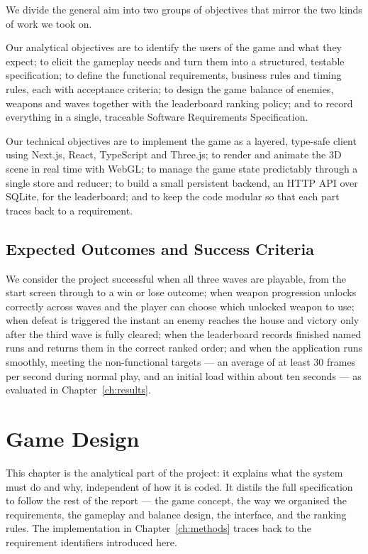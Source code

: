 \documentclass[12pt,a4paper]{report}
\begin{document}
We divide the general aim into two groups of objectives that mirror the two
kinds of work we took on.

Our analytical objectives are to identify the users of the game and what they
expect; to elicit the gameplay needs and turn them into a structured, testable
specification; to define the functional requirements, business rules and timing
rules, each with acceptance criteria; to design the game balance of enemies,
weapons and waves together with the leaderboard ranking policy; and to record
everything in a single, traceable Software Requirements Specification.

Our technical objectives are to implement the game as a layered, type-safe
client using Next.js, React, TypeScript and Three.js; to render and animate the
3D scene in real time with WebGL; to manage the game state predictably through a
single store and reducer; to build a small persistent backend, an HTTP API over
SQLite, for the leaderboard; and to keep the code modular so that each part
traces back to a requirement.


\section{Expected Outcomes and Success Criteria}

We consider the project successful when all three waves are playable, from the
start screen through to a win or lose outcome; when weapon progression unlocks
correctly across waves and the player can choose which unlocked weapon to use;
when defeat is triggered the instant an enemy reaches the house and victory only
after the third wave is fully cleared; when the leaderboard records finished
named runs and returns them in the correct ranked order; and when the
application runs smoothly, meeting the non-functional targets --- an average of
at least 30 frames per second during normal play, and an initial load within
about ten seconds --- as evaluated in Chapter~\ref{ch:results}.

\chapter{Game Design}\label{ch:design}

This chapter is the analytical part of the project: it explains what the system
must do and why, independent of how it is coded. It distils the full
specification to
follow the rest of the report --- the game concept, the way we organised the
requirements, the gameplay and balance design, the interface, and the ranking
rules. The implementation in Chapter~\ref{ch:methods} traces back to the
requirement identifiers introduced here.
\end{document}
